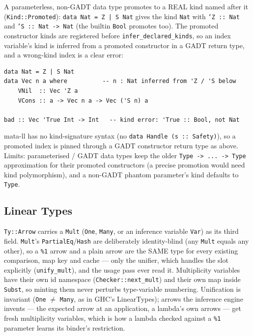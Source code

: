 \documentclass[11pt,a4paper]{article}
\begin{document}
A parameterless, non-GADT data type promotes to a REAL kind named after
it (\texttt{Kind::Promoted}): \texttt{data Nat = Z | S Nat} gives the
kind \texttt{Nat} with \texttt{'Z :: Nat} and \texttt{'S :: Nat -> Nat}
(the builtin \texttt{Bool} promotes too). The promoted constructor kinds
are registered before \texttt{infer\_declared\_kinds}, so an index
variable's kind is inferred from a promoted constructor in a GADT return
type, and a wrong-kind index is a clear error:
\begin{lstlisting}[language=MLL]
data Nat = Z | S Nat
data Vec n a where          -- n : Nat inferred from 'Z / 'S below
    VNil  :: Vec 'Z a
    VCons :: a -> Vec n a -> Vec ('S n) a

bad :: Vec 'True Int -> Int   -- kind error: 'True :: Bool, not Nat
\end{lstlisting}
mata-ll has no kind-signature syntax (no \texttt{data Handle (s ::
Safety)}), so a promoted index is pinned through a GADT constructor
return type as above. Limits: parameterised / GADT data types keep the
older \texttt{Type -> ... -> Type} approximation for their promoted
constructors (a precise promotion would need kind polymorphism), and a
non-GADT phantom parameter's kind defaults to \texttt{Type}.

\subsection{Linear Types}

\texttt{Ty::Arrow} carries a \texttt{Mult} (\texttt{One},
\texttt{Many}, or an inference variable \texttt{Var}) as its third
field.  \texttt{Mult}'s \texttt{PartialEq}/\texttt{Hash} are
deliberately identity-blind (any \texttt{Mult} equals any other), so a
\texttt{\%1} arrow and a plain arrow are the SAME type for every
existing comparison, map key and cache --- only the unifier, which
handles the slot explicitly (\texttt{unify\_mult}), and the usage pass
ever read it.  Multiplicity variables have their own id namespace
(\texttt{Checker::next\_mult}) and their own map inside \texttt{Subst},
so minting them never perturbs type-variable numbering.  Unification is
invariant (\texttt{One} $\neq$ \texttt{Many}, as in GHC's
LinearTypes); arrows the inference engine invents --- the expected
arrow at an application, a lambda's own arrows --- get fresh
multiplicity variables, which is how a lambda checked against a
\texttt{\%1} parameter learns its binder's restriction.
\end{document}
